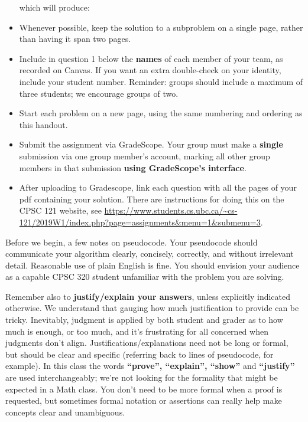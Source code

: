 \documentclass[11pt]{article}
\begin{document}
\begin{itemize}
which will produce:

\begin{soln}
\end{soln}

\item
Whenever possible, keep the solution to a subproblem on a single page, rather than having it span two pages.  

\item Include in question 1 below the \textbf{names} of each member
  of your team, as recorded on Canvas. If you want an extra
double-check on your identity, include your student number.
Reminder: groups should include a
maximum of three students; we encourage groups of two.
\item 
Start each problem on a new page, using the same numbering and ordering as this
handout.
\item
  Submit the assignment via GradeScope.
  Your group must make a \textbf{single} submission via one group member's account, marking all other group members in that submission \textbf{using GradeScope's interface}. 
\item
After uploading to Gradescope, link each question with all the pages
of your pdf containing your solution. There are instructions for doing this on the CPSC 121 website, see \url{https://www.students.cs.ubc.ca/~cs-121/2019W1/index.php?page=assignments&menu=1&submenu=3}.
\end{itemize}

Before  we  begin, a  few  notes  on pseudocode. Your
pseudocode should  communicate your
algorithm  clearly,  concisely,  correctly, and  without  irrelevant  detail.
Reasonable  use of  plain  English is  fine. You  should
envision your  audience as  a capable  CPSC 320  student unfamiliar  with the
problem you are solving.

Remember also to \textbf{justify/explain your answers}, unless explicitly indicated otherwise.  We understand
that gauging how much justification to provide can be tricky.
Inevitably, judgment is applied by both student and grader as to how
much is enough, or too much, and it's frustrating for all concerned when judgments
don't align.  Justifications/explanations need not be long or formal,
but should be clear and specific (referring back to lines of
pseudocode, for example). In this class the words \textbf{``prove'',
``explain'', ``show''} and \textbf{``justify''} are used interchangeably; we're
not looking for the formality that might be expected in a Math
class. You don't need to be more formal when a proof is requested, but
sometimes formal notation or assertions can really help make concepts
clear and unambiguous.
\end{document}
